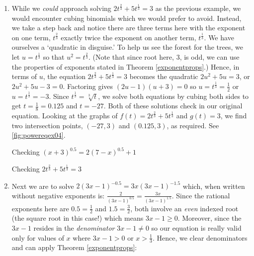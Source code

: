 \begin{ex}
\begin{enumerate}
\item  While we \textit{could} approach solving  $2t^{\frac{2}{3}} + 5t^{\frac{1}{3}} = 3$ as the previous example, we would encounter cubing binomials which we would prefer to avoid.  Instead, we take a step back and notice there are three terms here with the exponent on one term, $t^{\frac{2}{3}}$ exactly twice the exponent on another term, $t^{\frac{1}{3}}$.  We have ourselves a `quadratic in disguise.' To help us see the forest for the trees, we let $u = t^{\frac{1}{3}}$ so that $u^2 = t^{\frac{2}{3}}$. (Note that since root here, $3$, is odd, we can use the properties of exponents stated in Theorem \ref{exponentprops}.)  Hence, in terms of $u$, the equation   $2t^{\frac{2}{3}} + 5t^{\frac{1}{3}} = 3$ becomes the quadratic $2u^2 + 5u = 3$, or $2u^2 + 5u - 3 = 0$.  Factoring gives $(2u-1)(u+3) = 0$ so $u = t^{\frac{1}{3}} = \frac{1}{2}$ or $u = t^{\frac{1}{3}} = -3$.  Since $t^{\frac{1}{3}} = \sqrt[3]{t}$, we solve both equations by cubing both sides to get $t = \frac{1}{8} = 0.125$ and $t = -27$.  Both of these solutions check in our original equation.  Looking at the graphs of $f(t) = 2t^{\frac{2}{3}} + 5t^{\frac{1}{3}}$ and $g(t) = 3$, we find two intersection points, $(-27,3)$ and $(0.125,3)$, as required. See \autoref{fig:powereqex04}.

\begin{mfigure}


\caption{Checking $(x+3)^{0.5} = 2(7-x)^{0.5}+1$}
\label{fig:powereqex03}
\end{mfigure}

\begin{mfigure}
      

\caption{Checking  $2t^{\frac{2}{3}} + 5t^{\frac{1}{3}} = 3$}
\label{fig:powereqex04}
\end{mfigure}

\item Next we are to solve $2(3x-1)^{-0.5}  = 3x (3x-1)^{-1.5}$ which, when written without negative exponents is: $\frac{2}{(3x-1)^{0.5}} = \frac{3x}{(3x-1)^{1.5}}$.  Since the rational exponents here are $0.5 = \frac{1}{2}$ and $1.5 = \frac{3}{2}$, both involve an \textit{even} indexed root (the square root in this case!) which means $3x-1 \geq 0$.  Moreover, since the $3x-1$ resides in the \textit{denominator} $3x - 1 \neq 0$ so our equation is really valid only for values of $x$ where $3x-1>0$ or $x > \frac{1}{3}$.  Hence, we clear denominators and can apply Theorem \ref{exponentprops}:


\end{enumerate}
\end{ex}
